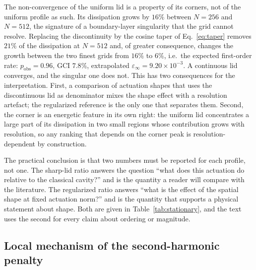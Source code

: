 \documentclass[11pt,a4paper]{article}
\begin{document}
The non-convergence of the uniform lid is a property of its corners, not of the
uniform profile as such. Its dissipation grows by $16\%$ between $N=256$ and
$N=512$, the signature of a boundary-layer singularity that the grid cannot
resolve. Replacing the discontinuity by the cosine taper of Eq.~\eqref{eq:taper}
removes $21\%$ of the dissipation at $N=512$ and, of greater consequence, changes the
growth between the two finest grids from $16\%$ to $6\%$, i.e.\ the expected
first-order rate: $p_{\mathrm{obs}}=0.96$, GCI $7.8\%$, extrapolated
$\varepsilon_\infty=9.20\times10^{-3}$. A continuous lid converges, and
the singular one does not. This has two consequences for the interpretation. First,
a comparison of actuation shapes that uses the discontinuous lid as denominator
mixes the shape effect with a resolution artefact; the regularized reference is
the only one that separates them. Second, the corner is an energetic feature in
its own right: the uniform lid concentrates a large part of its dissipation in two
small regions whose contribution grows with resolution, so any ranking that
depends on the corner peak is resolution-dependent by construction.

The practical conclusion is that two numbers must be reported for each profile,
not one. The sharp-lid ratio answers the question ``what does this actuation do
relative to the classical cavity?'' and is the quantity a reader will compare with
the literature. The regularized ratio answers ``what is the effect of the spatial
shape at fixed actuation norm?'' and is the quantity that supports a physical
statement about shape. Both are given in Table~\ref{tab:stationary}, and the text
uses the second for every claim about ordering or magnitude.

\subsection{Local mechanism of the second-harmonic penalty}
\label{sec:mechanism}
\end{document}
